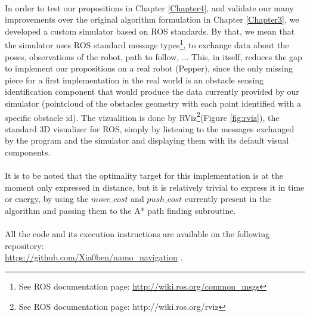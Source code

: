 \paragraph{} In order to test our propositions in Chapter \ref{Chapter4}, and validate our many improvements over the original algorithm formulation in Chapter \ref{Chapter3}, we developed a custom simulator based on ROS standards. By that, we mean that the simulator uses ROS standard message types\footnote{See ROS documentation page: \url{http://wiki.ros.org/common_msgs}}, to exchange data about the poses, observations of the robot, path to follow, ... This, in itself, reduces the gap to implement our propositions on a real robot (Pepper), since the only missing piece for a first implementation in the real world is an obstacle sensing identification component that would produce the data currently provided by our simulator (pointcloud of the obstacles geometry with each point identified with a specific obstacle id). The vizualition is done by RViz\footnote{See ROS documentation page: http://wiki.ros.org/rviz}(Figure \ref{fig:rviz}), the standard 3D visualizer for ROS, simply by listening to the messages exchanged by the program and the simulator and displaying them with its default visual components.

\paragraph{} It is to be noted that the optimality target for this implementation is at the moment only expressed in distance, but it is relatively trivial to express it in time or energy, by using the $move\_cost$ and $push\_cost$ currently present in the algorithm and passing them to the A* path finding subroutine.

\paragraph{} All the code and its execution instructions are available on the following repository: \\ \url{https://github.com/Xia0ben/namo_navigation} .

